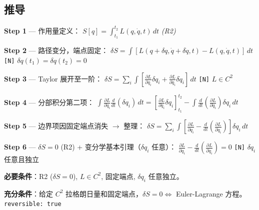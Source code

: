 \subsection{推导}

\begin{derivationbox}
  \textbf{Step 1} — 作用量定义：
  $S[q] = \int_{t_1}^{t_2} L(q,\dot{q},t)\,dt$
  \hfill\textit{(R2)}

  \textbf{Step 2} — 路径变分，端点固定：
  $\delta S = \int [L(q+\delta q, \dot{q}+\delta\dot{q},t) - L(q,\dot{q},t)]\,dt$
  \hfill\texttt{[N]} $\delta q(t_1)=\delta q(t_2)=0$

  \textbf{Step 3} — Taylor 展开至一阶：
  $\delta S = \sum_i \int [\frac{\partial L}{\partial q_i}\delta q_i + \frac{\partial L}{\partial \dot{q}_i}\delta\dot{q}_i]\,dt$
  \hfill\texttt{[N]} $L \in C^2$

  \textbf{Step 4} — 分部积分第二项：
  $\int \frac{\partial L}{\partial\dot{q}_i}\frac{d}{dt}(\delta q_i)\,dt = [\frac{\partial L}{\partial\dot{q}_i}\delta q_i]_{t_1}^{t_2} - \int \frac{d}{dt}(\frac{\partial L}{\partial\dot{q}_i})\delta q_i\,dt$

  \textbf{Step 5} — 边界项因固定端点消失 $\to$ 整理：
  $\delta S = \sum_i \int [\frac{\partial L}{\partial q_i} - \frac{d}{dt}(\frac{\partial L}{\partial\dot{q}_i})]\delta q_i\,dt$

  \textbf{Step 6} — $\delta S = 0$ (R2) + 变分学基本引理（$\delta q_i$ 任意）：
  $\frac{\partial L}{\partial q_i} - \frac{d}{dt}(\frac{\partial L}{\partial\dot{q}_i}) = 0$
  \hfill\texttt{[N]} $\delta q_i$ 任意且独立
\end{derivationbox}

\textbf{必要条件}：R2 ($\delta S=0$), $L \in C^2$, 固定端点, $\delta q_i$ 任意独立。

\textbf{充分条件}：给定 $C^2$ 拉格朗日量和固定端点，$\delta S = 0 \iff$ Euler-Lagrange 方程。\texttt{reversible: true}



